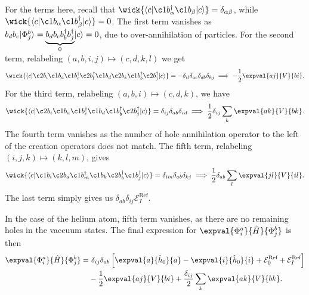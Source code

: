 For the terms here, recall that $\wick{\langle c \vert \c1 b_\alpha^\dagger \c1 b_\beta \vert c \rangle} = \delta_{\alpha \beta}$, while $\wick{\langle c \vert \c1 b_\alpha \c1 b_\beta^\dagger \vert c \rangle} = 0$.
The first term vanishes as $b_d b_c\lvert\Phi_j^{b}\rangle =  \underbrace{b_d b_c b_b^\dagger b_j^\dagger}_{0}\lvert c\rangle= 0$, due to over-annihilation of particles.
For the second term, relabeling $(a, b, i, j) \mapsto (c, d, k, l)$ we get
\begin{equation*}
    \wick{
        \langle
        c \vert
        \c2 b_i
        \c1 b_a
        \c1 b_c^\dagger
        \c2 b_l^\dagger
        \c1 b_d
        \c2 b_k
        \c1 b_b^\dagger
        \c2 b_j^\dagger
        \vert c
        \rangle
    } = -\delta_{il} \delta_{ac} \delta_{db} \delta_{kj} \implies
    -\frac{1}{2} \expval{a j}{V}{b i}.
\end{equation*}
For the third term, relabeling $(a, b, i) \mapsto (c, d, k)$, we have
\begin{equation*}
    \wick{
        \langle
        c \vert
        \c2 b_i
        \c1 b_a
        \c1 b_c^\dagger
        \c1 b_d
        \c1 b_b^\dagger
        \c2 b_j^\dagger
        \vert c
        \rangle
    } = \delta_{ij} \delta_{ab} \delta_{cd} \implies
    \frac{1}{2} \delta_{ij} \sum_{k} \expval{a k}{V}{b k}.
\end{equation*}
The fourth term vanishes as the number of hole annihilation operator to the left of the creation operators does not match.
The fifth term, relabeling $(i, j, k) \mapsto (k, l, m)$, gives
\begin{equation*}
    \wick{
        \langle
        c \vert
        \c1 b_i
        \c2 b_a
        \c1 b_m^\dagger
        \c1 b_k
        \c2 b_b^\dagger
        \c1 b_j^\dagger
        \vert c
        \rangle
    } = \delta_{im} \delta_{ab} \delta_{kj} \implies
    \frac{1}{2} \delta_{ab} \sum_{l} \expval{j l}{V}{i l}.
\end{equation*}
The last term simply gives us $\delta_{ab} \delta_{ij} \mathcal{E}_I^{\text{Ref}}$.

In the case of the helium atom, fifth term vanishes, as there are no remaining holes in the vaccuum states. %
The final expression for $\expval{\Phi_i^a}{\hat{H}}{\Phi_j^b}$ is then
\begin{equation}\label{eq:1p1h-1p1h}
    \begin{split}
        \expval{\Phi_i^a}{\hat{H}}{\Phi_j^b}
        =& \ \delta_{ij} \delta_{ab} \left[
            \expval{a}{\hat{h}_0}{a}
            - \expval{i}{\hat{h}_0}{i}
            + \mathcal{E}_0^{\text{Ref}}
            + \mathcal{E}_I^{\text{Ref}}
        \right] \\
        &- \frac{1}{2} \expval{a j}{V}{b i}
        + \frac{\delta_{ij}}{2} \sum_{k} \expval{a k}{V}{b k}.
    \end{split}
\end{equation}


